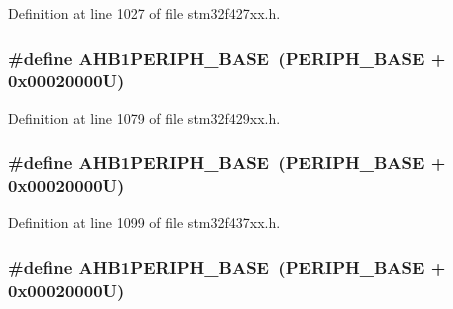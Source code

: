 Definition at line 1027 of file stm32f427xx.\+h.

\subsubsection[{\texorpdfstring{A\+H\+B1\+P\+E\+R\+I\+P\+H\+\_\+\+B\+A\+SE}{AHB1PERIPH_BASE}}]{\setlength{\rightskip}{0pt plus 5cm}\#define A\+H\+B1\+P\+E\+R\+I\+P\+H\+\_\+\+B\+A\+SE~({\bf P\+E\+R\+I\+P\+H\+\_\+\+B\+A\+SE} + 0x00020000\+U)}\hypertarget{group___peripheral__memory__map_ga811a9a4ca17f0a50354a9169541d56c4}{}\label{group___peripheral__memory__map_ga811a9a4ca17f0a50354a9169541d56c4}


Definition at line 1079 of file stm32f429xx.\+h.

\subsubsection[{\texorpdfstring{A\+H\+B1\+P\+E\+R\+I\+P\+H\+\_\+\+B\+A\+SE}{AHB1PERIPH_BASE}}]{\setlength{\rightskip}{0pt plus 5cm}\#define A\+H\+B1\+P\+E\+R\+I\+P\+H\+\_\+\+B\+A\+SE~({\bf P\+E\+R\+I\+P\+H\+\_\+\+B\+A\+SE} + 0x00020000\+U)}\hypertarget{group___peripheral__memory__map_ga811a9a4ca17f0a50354a9169541d56c4}{}\label{group___peripheral__memory__map_ga811a9a4ca17f0a50354a9169541d56c4}


Definition at line 1099 of file stm32f437xx.\+h.

\subsubsection[{\texorpdfstring{A\+H\+B1\+P\+E\+R\+I\+P\+H\+\_\+\+B\+A\+SE}{AHB1PERIPH_BASE}}]{\setlength{\rightskip}{0pt plus 5cm}\#define A\+H\+B1\+P\+E\+R\+I\+P\+H\+\_\+\+B\+A\+SE~({\bf P\+E\+R\+I\+P\+H\+\_\+\+B\+A\+SE} + 0x00020000\+U)}\hypertarget{group___peripheral__memory__map_ga811a9a4ca17f0a50354a9169541d56c4}{}\label{group___peripheral__memory__map_ga811a9a4ca17f0a50354a9169541d56c4}


